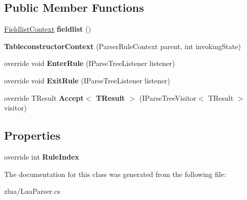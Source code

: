 \subsection*{Public Member Functions}
\begin{DoxyCompactItemize}
\item 
\mbox{\label{classzlua_1_1_lua_parser_1_1_tableconstructor_context_a022ff40025ee9f020bb7b4244bf10e3f}} 
\mbox{\hyperlink{classzlua_1_1_lua_parser_1_1_fieldlist_context}{Fieldlist\+Context}} {\bfseries fieldlist} ()
\item 
\mbox{\label{classzlua_1_1_lua_parser_1_1_tableconstructor_context_ae8e81762509de269a036d55551a81a9b}} 
{\bfseries Tableconstructor\+Context} (Parser\+Rule\+Context parent, int invoking\+State)
\item 
\mbox{\label{classzlua_1_1_lua_parser_1_1_tableconstructor_context_af91efe00e7a5aab174dfa644afc07a4e}} 
override void {\bfseries Enter\+Rule} (I\+Parse\+Tree\+Listener listener)
\item 
\mbox{\label{classzlua_1_1_lua_parser_1_1_tableconstructor_context_a3c480e471e5425e05d755da791d34041}} 
override void {\bfseries Exit\+Rule} (I\+Parse\+Tree\+Listener listener)
\item 
\mbox{\label{classzlua_1_1_lua_parser_1_1_tableconstructor_context_adabc4db0ede392743b0ef3f55eade811}} 
override T\+Result {\bfseries Accept$<$ T\+Result $>$} (I\+Parse\+Tree\+Visitor$<$ T\+Result $>$ visitor)
\end{DoxyCompactItemize}
\subsection*{Properties}
\begin{DoxyCompactItemize}
\item 
\mbox{\label{classzlua_1_1_lua_parser_1_1_tableconstructor_context_a6787d5ed1b7c23e83e5a824c010a2e45}} 
override int {\bfseries Rule\+Index}
\end{DoxyCompactItemize}


The documentation for this class was generated from the following file\+:\begin{DoxyCompactItemize}
\item 
zlua/Lua\+Parser.\+cs\end{DoxyCompactItemize}
